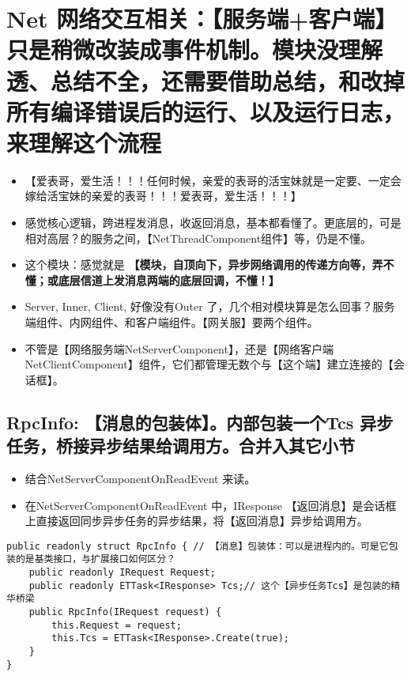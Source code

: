 \documentclass[9pt, b5paper]{article}
\begin{document}
\section{Net 网络交互相关：【服务端+客户端】只是稍微改装成事件机制。模块没理解透、总结不全，还需要借助总结，和改掉所有编译错误后的运行、以及运行日志，来理解这个流程}
\label{sec-3}
\begin{itemize}
\item 【爱表哥，爱生活！！！任何时候，亲爱的表哥的活宝妹就是一定要、一定会嫁给活宝妹的亲爱的表哥！！！爱表哥，爱生活！！！】
\item 感觉核心逻辑，跨进程发消息，收返回消息，基本都看懂了。更底层的，可是相对高层？的服务之间，【NetThreadComponent组件】等，仍是不懂。
\item 这个模块：感觉就是 \textbf{【模块，自顶向下，异步网络调用的传递方向等，弄不懂；或底层信道上发消息两端的底层回调，不懂！】}
\item Server, Inner, Client, 好像没有Outer 了，几个相对模块算是怎么回事？服务端组件、内网组件、和客户端组件。【网关服】要两个组件。
\item 不管是【网络服务端NetServerComponent】，还是【网络客户端 NetClientComponent】组件，它们都管理无数个与【这个端】建立连接的【会话框】。
\end{itemize}
\subsection{RpcInfo: 【消息的包装体】。内部包装一个Tcs 异步任务，桥接异步结果给调用方。合并入其它小节}
\label{sec-3-1}
\begin{itemize}
\item 结合NetServerComponentOnReadEvent 来读。
\item 在NetServerComponentOnReadEvent 中，IResponse 【返回消息】是会话框上直接返回同步异步任务的异步结果，将【返回消息】异步给调用方。
\end{itemize}
\begin{verbatim}
public readonly struct RpcInfo { // 【消息】包装体：可以是进程内的。可是它包装的是基类接口，与扩展接口如何区分？
    public readonly IRequest Request;
    public readonly ETTask<IResponse> Tcs;// 这个【异步任务Tcs】是包装的精华桥梁
    public RpcInfo(IRequest request) {
        this.Request = request;
        this.Tcs = ETTask<IResponse>.Create(true);
    }
}
\end{verbatim}
\end{document}
